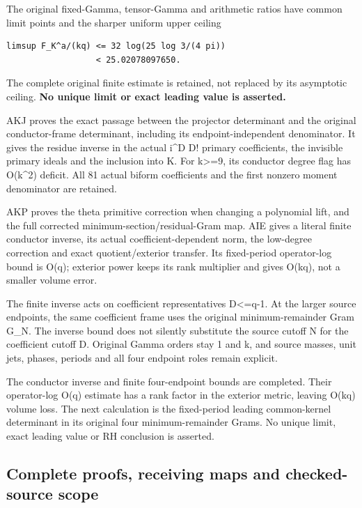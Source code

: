\documentclass[
]{article}
\begin{document}
The original fixed-Gamma, tensor-Gamma and arithmetic ratios have common
limit points and the sharper uniform upper ceiling

\begin{verbatim}
limsup F_K^a/(kq) <= 32 log(25 log 3/(4 pi))
                  < 25.02078097650.
\end{verbatim}

The complete original finite estimate is retained, not replaced by its
asymptotic ceiling. \textbf{No unique limit or exact leading value is
asserted.}

AKJ proves the exact passage between the projector determinant and the
original conductor-frame determinant, including its endpoint-independent
denominator. It gives the residue inverse in the actual i\^{}D D!
primary coefficients, the invisible primary ideals and the inclusion
into K. For k\textgreater=9, its conductor degree flag has O(k\^{}2)
deficit. All 81 actual biform coefficients and the first nonzero moment
denominator are retained.

AKP proves the theta primitive correction when changing a polynomial
lift, and the full corrected minimum-section/residual-Gram map. AIE
gives a literal finite conductor inverse, its actual
coefficient-dependent norm, the low-degree correction and exact
quotient/exterior transfer. Its fixed-period operator-log bound is O(q);
exterior power keeps its rank multiplier and gives O(kq), not a smaller
volume error.

The finite inverse acts on coefficient representatives D\textless=q-1.
At the larger source endpoints, the same coefficient frame uses the
original minimum-remainder Gram G\_N. The inverse bound does not
silently substitute the source cutoff N for the coefficient cutoff D.
Original Gamma orders stay 1 and k, and source masses, unit jets,
phases, periods and all four endpoint roles remain explicit.

The conductor inverse and finite four-endpoint bounds are completed.
Their operator-log O(q) estimate has a rank factor in the exterior
metric, leaving O(kq) volume loss. The next calculation is the
fixed-period leading common-kernel determinant in its original four
minimum-remainder Grams. No unique limit, exact leading value or RH
conclusion is asserted.

\subsection{Complete proofs, receiving maps and checked-source
scope}\label{complete-proofs-receiving-maps-and-checked-source-scope}
\end{document}
